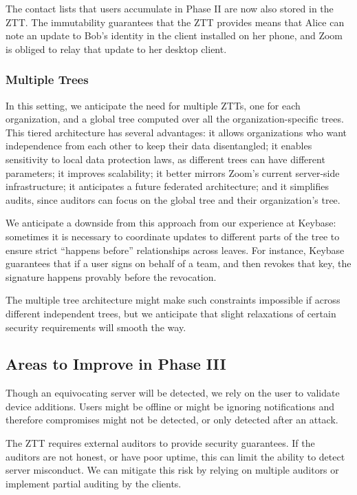 The contact lists that users accumulate in Phase II are now also stored in the ZTT. The immutability guarantees that the ZTT provides means that Alice can note an update to Bob's identity in the client installed on her phone, and Zoom is obliged to relay that update to her desktop client.

\subsubsection{Multiple Trees}

In this setting, we anticipate the need for multiple ZTTs, one for each organization, and a global tree computed over all the organization-specific trees. This tiered architecture has several advantages: it allows organizations who want independence from each other to keep their data disentangled; it enables sensitivity to local data protection laws, as different trees can have different parameters; it improves scalability; it better mirrors Zoom's current server-side infrastructure; it anticipates a future federated architecture; and it simplifies audits, since auditors can focus on the global tree and their organization's tree.

We anticipate a downside from this approach from our experience at Keybase: sometimes it is necessary to coordinate updates to different parts of the tree to ensure strict ``happens before'' relationships across leaves. For instance, Keybase guarantees that if a user signs on behalf of a team, and then revokes that key, the signature happens provably before the revocation.

The multiple tree architecture might make such constraints impossible if across different independent trees, but we anticipate that slight relaxations of certain security requirements will smooth the way.

\subsection{Areas to Improve in Phase III}

Though an equivocating server will be detected, we rely on the user to validate device additions. Users might be offline or might be ignoring notifications and therefore compromises might not be detected, or only detected after an attack.

The ZTT requires external auditors to provide security guarantees. If the auditors are not honest, or have poor uptime, this can limit the ability to detect server misconduct. We can mitigate this risk by relying on multiple auditors or implement partial auditing by the clients.
